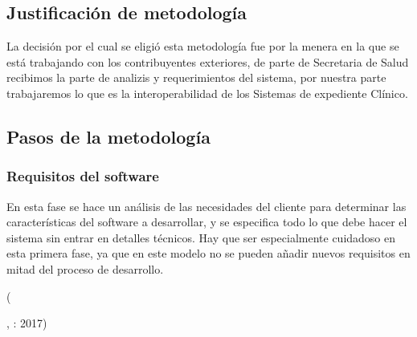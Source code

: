  \subsection{Justificación de metodología}

  La decisión por el cual se eligió esta metodología fue por la menera en la que se está trabajando con los contribuyentes exteriores, de parte de Secretaria de Salud recibimos la parte de analizis y requerimientos del sistema, por nuestra parte trabajaremos lo que es la interoperabilidad de los Sistemas de expediente Clínico.
        \subsection{Pasos de la metodología}
            \subsubsection{ Requisitos del software}
      \begin{center}
        \begin{minipage}{0.9\linewidth}
          \vspace{5pt}%
          {\small
                En esta fase se hace un análisis de las necesidades del cliente para determinar las características del software a desarrollar, y se especifica todo lo que debe hacer el sistema sin entrar en detalles técnicos. Hay que ser especialmente cuidadoso en esta primera fase, ya que en este modelo no se pueden añadir nuevos requisitos en mitad del proceso de desarrollo.
          }
          \begin{flushright}
            (\author{En qué consiste el modelo en cascada.},
            : 2017)
          \end{flushright}
            \vspace{5pt}%
        \end{minipage}
      \end{center}

